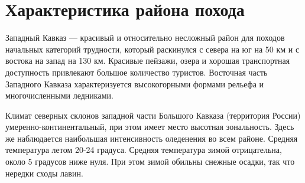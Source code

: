 \section{Характеристика района похода}\label{sec:characteristics_of_area}
    Западный Кавказ — красивый и относительно несложный район для походов начальных категорий трудности,
    который раскинулся с севера на юг на 50 км и с востока на запад на 130 км. Красивые пейзажи, озера и
    хорошая транспортная доступность привлекают большое количество туристов. Восточная часть Западного
    Кавказа характеризуется высокогорными формами рельефа и многочисленными ледниками. 

    Климат северных склонов западной части Большого Кавказа (территория России) умеренно-континентальный,
    при этом имеет место высотная зональность.  Здесь же наблюдается наибольшая интенсивность оледенения
    во всем районе. Средняя температура летом 20-24 градуса. Средняя температура зимой отрицательна, около
    5 градусов ниже нуля. При этом зимой обильны снежные осадки, так что нередки сходы лавин.
